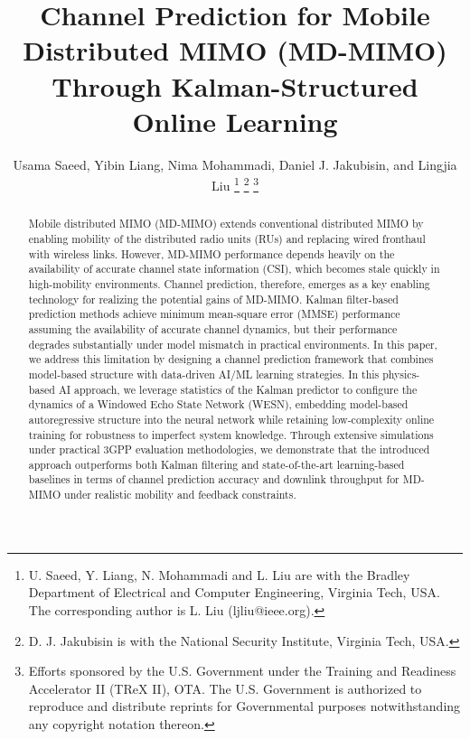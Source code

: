 \documentclass[lettersize,journal]{IEEEtran}
\begin{document}
\title{
Channel Prediction for Mobile Distributed MIMO (MD-MIMO) Through Kalman-Structured Online Learning
}


\author{Usama Saeed,
        Yibin Liang,
        Nima Mohammadi,        
        Daniel J. Jakubisin,
        and Lingjia Liu
\thanks{U. Saeed, Y. Liang, N. Mohammadi and L. Liu are with the Bradley Department of Electrical and Computer Engineering, Virginia Tech, USA. The corresponding author is L. Liu (ljliu@ieee.org).}
\thanks{D. J. Jakubisin is with the National Security Institute, Virginia Tech, USA.}
\thanks{
Efforts sponsored by the U.S. Government under the Training and Readiness Accelerator II (TReX II), OTA. The U.S. Government is authorized to reproduce and distribute reprints for Governmental purposes notwithstanding any copyright notation thereon.}}

\maketitle
\thispagestyle{empty}
\pagestyle{empty}

\begin{abstract}
Mobile distributed MIMO (MD-MIMO) extends conventional distributed MIMO by enabling mobility of the distributed radio units (RUs) and replacing wired fronthaul with wireless links. 
However, MD-MIMO performance depends heavily on the availability of accurate channel state information (CSI), which becomes stale quickly in high-mobility environments. 
Channel prediction, therefore, emerges as a key enabling technology for realizing the potential gains of MD-MIMO.
Kalman filter-based prediction methods achieve minimum mean-square error (MMSE) performance assuming the availability of accurate channel dynamics, but their performance degrades substantially under model mismatch in practical environments.
In this paper, we address this limitation by designing a channel prediction framework that combines model-based structure with data-driven AI/ML learning strategies.
In this physics-based AI approach, we leverage statistics of the Kalman predictor to configure the dynamics of a Windowed Echo State Network (WESN), embedding model-based autoregressive structure into the neural network while retaining low-complexity online training for robustness to imperfect system knowledge. 
Through extensive simulations under practical 3GPP evaluation methodologies, we demonstrate that the introduced approach outperforms both Kalman filtering and state-of-the-art learning-based baselines in terms of channel prediction accuracy and downlink throughput for MD-MIMO under realistic mobility and feedback constraints.

\end{abstract}
\end{document}
